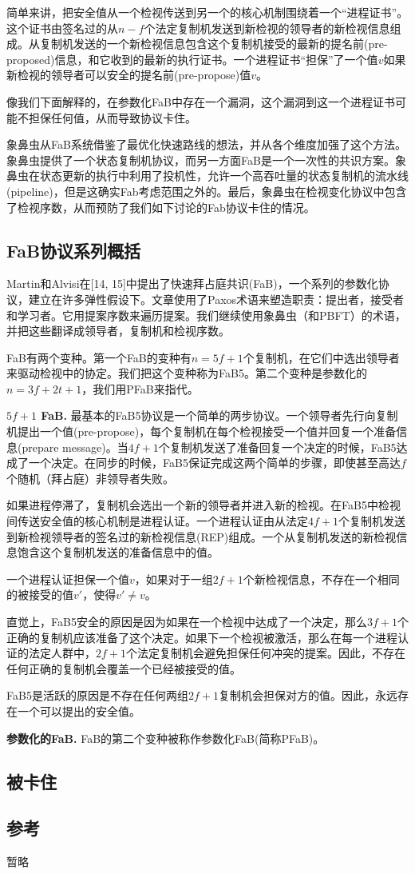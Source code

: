 \documentclass[UTF8]{ctexart}
\begin{document}
简单来讲，把安全值从一个检视传送到另一个的核心机制围绕着一个“进程证书”。这个证书由签名过的从$n - f$个法定复制机发送到新检视的领导者的新检视信息组成。从复制机发送的一个新检视信息包含这个复制机接受的最新的提名前(pre-proposed)信息，和它收到的最新的执行证书。一个进程证书“担保”了一个值$v$如果新检视的领导者可以安全的提名前(pre-propose)值$v$。

像我们下面解释的，在参数化FaB中存在一个漏洞，这个漏洞到这一个进程证书可能不担保任何值，从而导致协议卡住。

象鼻虫从FaB系统借鉴了最优化快速路线的想法，并从各个维度加强了这个方法。象鼻虫提供了一个状态复制机协议，而另一方面FaB是一个一次性的共识方案。象鼻虫在状态更新的执行中利用了投机性，允许一个高吞吐量的状态复制机的流水线(pipeline)，但是这确实Fab考虑范围之外的。最后，象鼻虫在检视变化协议中包含了检视序数，从而预防了我们如下讨论的Fab协议卡住的情况。

\subsection{FaB协议系列概括}
Martin和Alvisi在[14, 15]中提出了快速拜占庭共识(FaB)，一个系列的参数化协议，建立在许多弹性假设下。文章使用了Paxos术语来塑造职责：提出者，接受者和学习者。它用提案序数来遍历提案。我们继续使用象鼻虫（和PBFT）的术语，并把这些翻译成领导者，复制机和检视序数。

FaB有两个变种。第一个FaB的变种有$n = 5f + 1$个复制机，在它们中选出领导者来驱动检视中的协定。我们把这个变种称为FaB5。第二个变种是参数化的$n = 3f + 2t + 1$，我们用PFaB来指代。

\textbf{$5f + 1$ FaB.} \hspace{3mm} 最基本的FaB5协议是一个简单的两步协议。一个领导者先行向复制机提出一个值(pre-propose)，每个复制机在每个检视接受一个值并回复一个准备信息(prepare message)。当$4f + 1$个复制机发送了准备回复一个决定的时候，FaB5达成了一个决定。在同步的时候，FaB5保证完成这两个简单的步骤，即使甚至高达$f$个随机（拜占庭）非领导者失败。

如果进程停滞了，复制机会选出一个新的领导者并进入新的检视。在FaB5中检视间传送安全值的核心机制是进程认证。一个进程认证由从法定$4f + 1$个复制机发送到新检视领导者的签名过的新检视信息(REP)组成。一个从复制机发送的新检视信息饱含这个复制机发送的准备信息中的值。

一个进程认证担保一个值$v$，如果对于一组$2f + 1$个新检视信息，不存在一个相同的被接受的值$v'$，使得$v' \neq v$。

直觉上，FaB5安全的原因是因为如果在一个检视中达成了一个决定，那么$3f + 1$个正确的复制机应该准备了这个决定。如果下一个检视被激活，那么在每一个进程认证的法定人群中，$2f + 1$个法定复制机会避免担保任何冲突的提案。因此，不存在任何正确的复制机会覆盖一个已经被接受的值。

FaB5是活跃的原因是不存在任何两组$2f + 1$复制机会担保对方的值。因此，永远存在一个可以提出的安全值。

\textbf{参数化的FaB.} \hspace{3mm} FaB的第二个变种被称作参数化FaB(简称PFaB)。

\subsection{被卡住}

\subsection*{参考}
暂略
\end{document}
